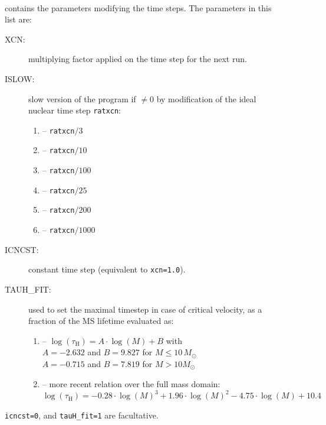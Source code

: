 \documentclass[11pt]{article}
\def\msol{\ensuremath{M_\odot}}
\begin{document}
\begin{description}
  \item[] ~\\ contains the parameters modifying the time steps. The parameters in this list are:
    \begin{description}
      \item[XCN:] multiplying factor applied on the time step for the next run.
      \item[ISLOW:] slow version of the program if $\ne 0$ by modification of the ideal nuclear time step {\tt ratxcn}:
      \begin{enumerate}[labelindent=.5cm,font=\ttfamily \bfseries,label=\arabic*]
        \item[1] -- {\tt ratxcn}$/3$
        \item[2] -- {\tt ratxcn}$/10$
        \item[3] -- {\tt ratxcn}$/100$
        \item[4] -- {\tt ratxcn}$/25$
        \item[5] -- {\tt ratxcn}$/200$
        \item[6] -- {\tt ratxcn}$/1000$
      \end{enumerate}
      \item[ICNCST:] constant time step (equivalent to \texttt{xcn=1.0}).
      \item[TAUH\_FIT:] used to set the maximal timestep in case of critical velocity, as a fraction of the MS lifetime evaluated as:
      \begin{enumerate}[labelindent=.5cm,font=\ttfamily \bfseries,label=\arabic*]
        \item[1] -- $\log(\tau_\text{H})=A\cdot\log(M)+B$ with\\
                 \hspace*{3em} $A=-2.632$ and $B = 9.827$ for $M \leq 10\,\msol$\\
                 \hspace*{3em} $A = -0.715$ and $B = 7.819$ for $M  > 10 \msol$
        \item[2] -- more recent relation over the full mass domain:\\ $\log(\tau_\text{H}) = -0.28\cdot\log(M)^3 + 1.96\cdot\log(M)^2 - 4.75\cdot\log(M) + 10.4$
      \end{enumerate}
    \end{description}
    \texttt{icncst=0}, and \texttt{tauH\_fit=1} are facultative.


\end{description}
\end{document}
